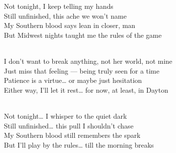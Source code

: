 \begin{lyrics}
Not tonight, I keep telling my hands\\
Still unfinished, this ache we won’t name\\
My Southern blood says lean in closer, man\\
But Midwest nights taught me the rules of the game

\\
I don’t want to break anything, not her world, not mine\\
Just miss that feeling — being truly seen for a time\\
Patience is a virtue… or maybe just hesitation\\
Either way, I’ll let it rest… for now, at least, in Dayton

\\
Not tonight… I whisper to the quiet dark\\
Still unfinished… this pull I shouldn’t chase\\
My Southern blood still remembers the spark\\
But I’ll play by the rules… till the morning breaks

\end{lyrics}

